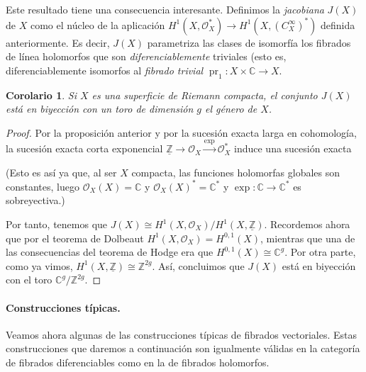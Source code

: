 \documentclass[12pt,a4paper]{article}
\newtheorem{corol}[thm]{Corolario}
\theoremstyle{definition} \newtheorem{defn}[thm]{Definición}
\theoremstyle{definition} \newtheorem{ejemplo}[thm]{Ejemplo}
\theoremstyle{definition} \newtheorem{ejercicio}[thm]{Ejercicio}
\def\CC{\mathbb{C}}
\def\OO{\mathscr{O}}
\DeclareMathOperator{\pr}{pr}
\begin{document}
	  Este resultado tiene una consecuencia interesante. Definimos la \emph{jacobiana} $J(X)$ de $X$ como el núcleo de la aplicación $H^1(X,\OO^*_X) \rightarrow H^1(X,(C^\infty_X)^*)$ definida anteriormente. Es decir, $J(X)$ parametriza las clases de isomorfía los fibrados de línea holomorfos que son \emph{diferenciablemente} triviales (esto es, diferenciablemente isomorfos al \emph{fibrado trivial} $\pr_1:X\times \CC \rightarrow X$.

	  \begin{corol}
	   Si $X$ es una superficie de Riemann compacta, el conjunto $J(X)$ está en biyección con un toro de dimensión $g$ el género de $X$.
	  \end{corol}

	  \begin{proof}
	    Por la proposición anterior y por la sucesión exacta larga en cohomología, la sucesión exacta corta exponencial $\underline{\mathbb{Z}} \rightarrow \OO_X \overset{\exp}{\rightarrow} \OO_X^*$ induce una sucesión exacta
	    \begin{center}
	    \end{center}
	    (Esto es así ya que, al ser $X$ compacta, las funciones holomorfas globales son constantes, luego $\OO_X(X)=\CC$ y $\OO_X(X)^*=\CC^*$ y $\exp:\CC \rightarrow \CC^*$ es sobreyectiva.)

	    Por tanto, tenemos que $J(X) \cong H^1(X,\OO_X) / H^1(X,\underline{\mathbb{Z}})$. Recordemos ahora que por el teorema de Dolbeaut $H^1(X,\OO_X) = H^{0,1}(X)$, mientras que una de las consecuencias del teorema de Hodge era que $H^{0,1}(X) \cong \CC^g$. Por otra parte, como ya vimos, $H^1(X,\underline{\mathbb{Z}})\cong \mathbb{Z}^{2g}$. Así, concluimos que $J(X)$ está en biyección con el toro $\CC^g/\mathbb{Z}^{2g}$.
	  \end{proof}

	    
	  \paragraph{Construcciones típicas.} Veamos ahora algunas de las construcciones típicas de fibrados vectoriales. Estas construcciones que daremos a continuación son igualmente válidas en la categoría de fibrados diferenciables como en la de fibrados holomorfos. 
\end{document}
